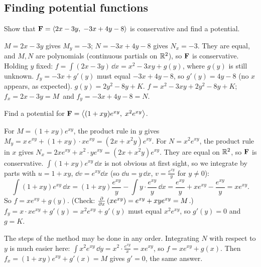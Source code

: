 \subsection{Finding potential functions}

\begin{problem}\label{q:pot2a}
Show that $\mathbf{F}=\left\langle 2x-3y,\;-3x+4y-8 \right\rangle$ is conservative and find a potential.
\end{problem}
\begin{solution}
 $M=2x-3y$ gives $M_y=-3$; $N=-3x+4y-8$ gives $N_x=-3$. They are equal, and $M,N$ are
polynomials (continuous partials on $\mathbb{R}^2$), so $\mathbf{F}$ is conservative.
 Holding $y$ fixed:
$f=\int(2x-3y)\,\dd x=x^2-3xy+g(y)$, where $g(y)$ is still unknown.
$f_y=-3x+g'(y)$ must equal $-3x+4y-8$, so $g'(y)=4y-8$ (no $x$ appears, as expected).
 $g(y)=2y^2-8y+K$.
 $f=x^2-3xy+2y^2-8y+K$; $f_x=2x-3y=M$\checkok\ and
$f_y=-3x+4y-8=N$\checkok.
\end{solution}

\begin{problem}\label{q:pot2b}
Find a potential for $\mathbf{F}=\left\langle (1+xy)e^{xy},\;x^2e^{xy} \right\rangle$.
\end{problem}
\begin{solution}
 For $M=(1+xy)e^{xy}$, the product rule in $y$ gives
$M_y=x\,e^{xy}+(1+xy)\cdot xe^{xy}=(2x+x^2y)e^{xy}$.
For $N=x^2e^{xy}$, the product rule in $x$ gives $N_x=2xe^{xy}+x^2\cdot ye^{xy}=(2x+x^2y)e^{xy}$.
They are equal on $\mathbb{R}^2$, so $\mathbf{F}$ is conservative.
 $\int(1+xy)e^{xy}\,\dd x$ is not obvious at
first sight, so we integrate by parts with $u=1+xy$, $\dd v=e^{xy}\dd x$ (so $\dd u=y\,\dd x$,
$v=\frac{e^{xy}}{y}$ for $y\neq0$):
\[
  \int(1+xy)e^{xy}\,\dd x=(1+xy)\frac{e^{xy}}{y}-\int y\cdot\frac{e^{xy}}{y}\,\dd x
  =\frac{e^{xy}}{y}+xe^{xy}-\frac{e^{xy}}{y}=xe^{xy}.
\]
So $f=xe^{xy}+g(y)$. (Check: $\frac{\partial }{\partial x}\left(xe^{xy}\right)=e^{xy}+xye^{xy}=M$.)
 $f_y=x\cdot xe^{xy}+g'(y)=x^2e^{xy}+g'(y)$ must equal $x^2e^{xy}$, so
$g'(y)=0$ and $g=K$.

\begin{altmethod}
The steps of the method may be done in any order. Integrating $N$ with respect to
$y$ is much easier here: $\int x^2e^{xy}\,\dd y=x^2\cdot\frac{e^{xy}}{x}=xe^{xy}$, so
$f=xe^{xy}+g(x)$. Then $f_x=(1+xy)e^{xy}+g'(x)=M$ gives $g'=0$, the same answer.
\end{altmethod}
\end{solution}


